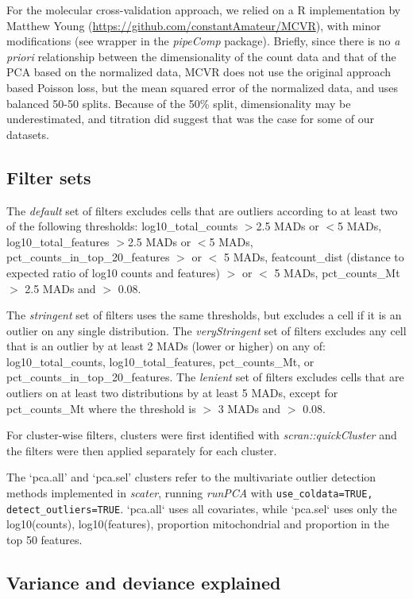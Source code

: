 \documentclass{bmcart}
\begin{document}
For the molecular cross-validation approach, we relied on a R implementation by Matthew Young (\url{https://github.com/constantAmateur/MCVR}), with minor modifications (see wrapper in the \textit{pipeComp} package). Briefly, since there is no \textit{a priori} relationship between the dimensionality of the count data and that of the PCA based on the normalized data, MCVR does not use the original approach based Poisson loss, but the mean squared error of the normalized data, and uses balanced 50-50 splits. Because of the 50\% split, dimensionality may be underestimated, and titration did suggest that was the case for some of our datasets.

\subsection*{Filter sets}
The \textit{default} set of filters excludes cells that are outliers according to at least two of the following thresholds: log10\_total\_counts $>$2.5 MADs or $<$5 MADs, log10\_total\_features $>$2.5 MADs or $<$5 MADs, pct\_counts\_in\_top\_20\_features $>$ or $<$ 5 MADs, featcount\_dist (distance to expected ratio of log10 counts and features) $>$ or $<$ 5 MADs, pct\_counts\_Mt $>$ 2.5 MADs and $>$ 0.08.

The \textit{stringent} set of filters uses the same thresholds, but excludes a cell if it is an outlier on any single distribution. 
The \textit{veryStringent} set of filters excludes any cell that is an outlier by at least 2 MADs (lower or higher) on any of: log10\_total\_counts, log10\_total\_features, pct\_counts\_Mt, or pct\_counts\_in\_top\_20\_features.
The \textit{lenient} set of filters excludes cells that are outliers on at least two distributions by at least 5 MADs, except for pct\_counts\_Mt where the threshold is $>$ 3 MADs and $>$ 0.08.

For cluster-wise filters, clusters were first identified with \textit{scran::quickCluster} and the filters were then applied separately for each cluster. 

The `pca.all' and `pca.sel' clusters refer to the multivariate outlier detection methods implemented in \textit{scater}, running \textit{runPCA} with \texttt{use\_coldata=TRUE, detect\_outliers=TRUE}. `pca.all` uses all covariates, while `pca.sel` uses only the log10(counts), log10(features), proportion mitochondrial and proportion in the top 50 features.

\subsection*{Variance and deviance explained}
\end{document}
